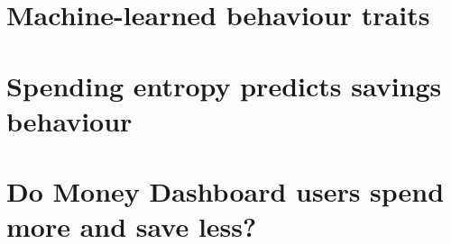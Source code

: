 \documentclass[a4paper, 12pt]{report}
\begin{document}
\maketitlepage


\tableofcontents
\listoftables
\listoffigures





\clearpage
{}



\chapter{Machine-learned behaviour traits}%
\label{cha:machine_learned_behaviour_traits}
% 
% 
% 
% 
% 

\chapter{Spending entropy predicts savings behaviour}%
\label{cha:spending_entropy_predicts_savings_behaviour}
% 
% 
% 
% 
% 
% 
% 
% 

\chapter{Do Money Dashboard users spend more and save less?}%
\label{cha:do_money_dashboard_users_spend_more_and_save_less_}
% 
% 
% 
% 
% 
% 



\newpage
\printbibliography
{}
\end{document}
